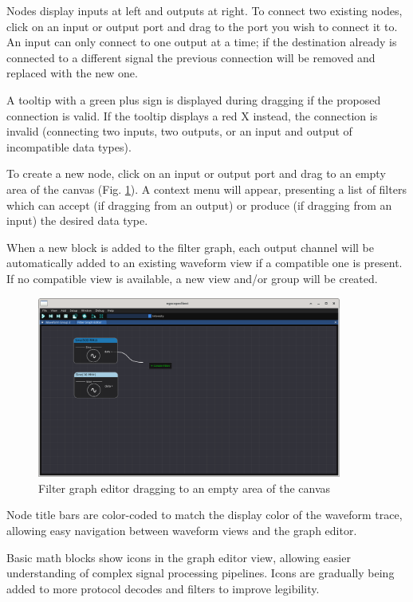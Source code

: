 Nodes display inputs at left and outputs at right. To connect two existing nodes, click on an input or output port and
drag to the port you wish to connect it to. An input can only connect to one output at a time; if the destination
already is connected to a different signal the previous connection will be removed and replaced with the new one.

A tooltip with a green plus sign is displayed during dragging if the proposed connection is valid. If the tooltip
displays a red X instead, the connection is invalid (connecting two inputs, two outputs, or an input and output of
incompatible data types).

To create a new node, click on an input or output port and drag to an empty area of the canvas (Fig.
\ref{graph-editor-create}). A context menu will appear, presenting a list of filters which can accept (if dragging from
an output) or produce (if dragging from an input) the desired data type.

When a new block is added to the filter graph, each output channel will be automatically added to an existing waveform
view if a compatible one is present. If no compatible view is available, a new view and/or group will be created.

\begin{figure}[H]
\centering
\includegraphics[width=10cm]{ng-images/graph-editor-create.png}
\caption{Filter graph editor dragging to an empty area of the canvas}
\label{graph-editor-create}
\end{figure}

Node title bars are color-coded to match the display color of the waveform trace, allowing easy navigation between
waveform views and the graph editor.

Basic math blocks show icons in the graph editor view, allowing easier understanding of complex signal processing
pipelines. Icons are gradually being added to more protocol decodes and filters to improve legibility.
